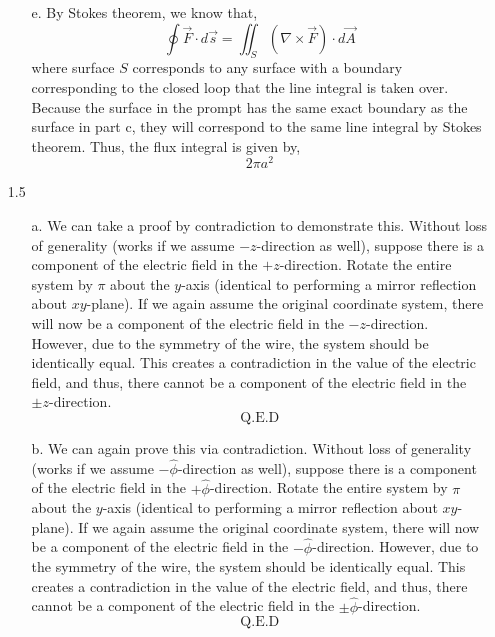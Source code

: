 \documentclass[12pt]{article}
\begin{document}
\begin{enumerate}
\begin{enumerate}
		\item [e.]
		By Stokes theorem, we know that,
		\[\oint \vec F \cdot d\vec s = \iint_S (\nabla \times \vec F)\cdot d\vec A\]
		where surface $S$ corresponds to any surface with a boundary corresponding to the closed loop that the line integral is taken over.
		Because the surface in the prompt has the same exact boundary as the surface in part c, they will correspond to the same line integral by Stokes theorem.
		Thus, the flux integral is given by,
		\[\boxed{2\pi a^2}\]




	\end{enumerate}

	\item [1.5]
	\begin{enumerate}
		\item [a.]
		We can take a proof by contradiction to demonstrate this.
		Without loss of generality (works if we assume $-z$-direction as well), suppose there is a component of the electric field in the $+z$-direction.
		Rotate the entire system by $\pi$ about the $y$-axis (identical to performing a mirror reflection about $xy$-plane).
		If we again assume the original coordinate system, there will now be a component of the electric field in the $-z$-direction.
		However, due to the symmetry of the wire, the system should be identically equal.
		This creates a contradiction in the value of the electric field, and thus, there cannot be a component of the electric field in the $\pm z$-direction.
		\[\boxed{\text{Q.E.D}}\]

		\item [b.]
		We can again prove this via contradiction.
		Without loss of generality (works if we assume $-\hat \phi$-direction as well), suppose there is a component of the electric field in the $+\hat \phi$-direction.
		Rotate the  entire system by $\pi$ about the $y$-axis (identical to performing a mirror reflection about $xy$-plane).
		If we again assume the original coordinate system, there will now be a component of the electric field in the $-\hat \phi$-direction.
		However, due to the symmetry of the wire, the system should be identically equal.
		This creates a contradiction in the value of the electric field, and thus, there cannot be a component of the electric field in the $\pm \hat \phi$-direction.
		\[\boxed{\text{Q.E.D}}\]


\end{enumerate}
\end{enumerate}
\end{document}
